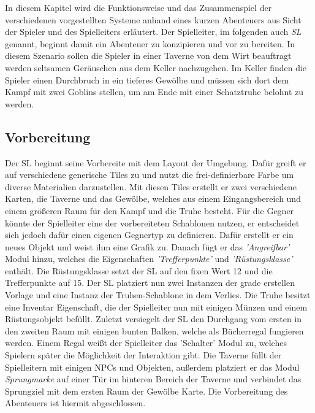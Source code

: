 In diesem Kapitel wird die Funktionsweise und das Zusammenspiel der verschiedenen vorgestellten Systeme anhand eines kurzen Abenteuers aus Sicht der Spieler und des Spielleiters erläutert.\newline
Der Spielleiter, im folgenden auch \emph{SL} genannt, beginnt damit ein Abenteuer zu konzipieren und vor zu bereiten. In diesem Szenario sollen die Spieler in einer Taverne von dem Wirt beauftragt werden seltsamen Geräuschen aus dem Keller nachzugehen. Im Keller finden die Spieler einen Durchbruch in ein tieferes Gewölbe und müssen sich dort dem Kampf mit zwei Goblins stellen, um am Ende mit einer Schatztruhe belohnt zu werden.\newline

\subsection{Vorbereitung}
\label{sec:Vorbereitung}
Der SL beginnt seine Vorbereite mit dem Layout der Umgebung. Dafür greift er auf verschiedene generische Tiles zu und nutzt die frei-definierbare Farbe um diverse Materialien darzustellen. Mit diesen Tiles erstellt er zwei verschiedene Karten, die Taverne und das Gewölbe, welches aus einem Eingangsbereich und einem größeren Raum für den Kampf und die Truhe besteht. Für die Gegner könnte der Spielleiter eine der vorbereiteten Schablonen nutzen, er entscheidet sich jedoch dafür einen eigenen Gegnertyp zu definieren. Dafür erstellt er ein neues Objekt und weist ihm eine Grafik zu. Danach fügt er das \emph{'Angreifbar'} Modul hinzu, welches die Eigenschaften \emph{'Trefferpunkte'} und \emph{'Rüstungsklasse'} enthält. Die Rüstungsklasse setzt der SL auf den fixen Wert 12 und die Trefferpunkte auf 15.\newline
Der SL platziert nun zwei Instanzen der grade erstellen Vorlage und eine Instanz der Truhen-Schablone in dem Verlies. Die Truhe besitzt eine Inventar Eigenschaft, die der Spielleiter nun mit einigen Münzen und einem Rüstungsobjekt befüllt. Zuletzt versiegelt der SL den Durchgang vom ersten in den zweiten Raum mit einigen bunten Balken, welche als Bücherregal fungieren werden. Einem Regal weißt der Spielleiter das 'Schalter' Modul zu, welches Spielern später die Möglichkeit der Interaktion gibt.\newline
Die Taverne füllt der Spielleitern mit einigen NPCs und Objekten, außerdem platziert er das Modul \emph{Sprungmarke} auf einer Tür im hinteren Bereich der Taverne und verbindet das Sprungziel mit dem ersten Raum der Gewölbe Karte.\newline
Die Vorbereitung des Abenteuers ist hiermit abgeschlossen.


